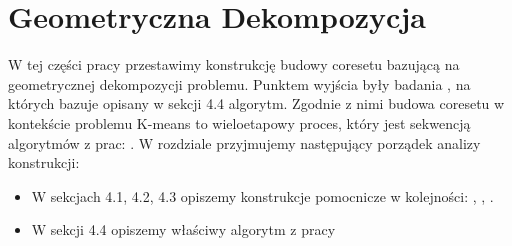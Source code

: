 \chapter{Geometryczna Dekompozycja}\label{geo}
W tej części pracy przestawimy konstrukcję budowy coresetu bazującą na geometrycznej dekompozycji problemu.
Punktem wyjścia były badania \cite{DBLP:journals/ki/MunteanuS18}, na których bazuje opisany w sekcji 4.4 algorytm.
Zgodnie z nimi budowa coresetu w kontekście problemu K-means to wieloetapowy proces, który jest sekwencją algorytmów z prac: \cite{Gonzalez1985ClusteringTM} \cite{10.1145/1007352.1007400} \cite{Arya2004LocalSH} \cite{DBLP:journals/ki/MunteanuS18}.
W rozdziale przyjmujemy następujący porządek analizy konstrukcji:
\begin{itemize}
    \item W sekcjach 4.1, 4.2, 4.3 opiszemy konstrukcje pomocnicze w kolejności: \cite{Gonzalez1985ClusteringTM}, \cite{10.1145/1007352.1007400}, \cite{Arya2004LocalSH}.
    \item W sekcji 4.4 opiszemy właściwy algorytm z pracy \cite{DBLP:journals/ki/MunteanuS18}
\end{itemize}





